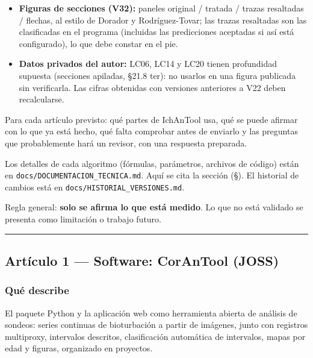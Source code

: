 \documentclass[
  10pt,
]{article}
\begin{document}
\begin{itemize}
  porcentajes, BI ni ii, solo distribución de presencias por intervalo.
  Indicar en los métodos qué tramos se analizaron en este modo.
\item
  \textbf{Figuras de secciones (V32):} paneles original / tratada /
  trazas resaltadas / flechas, al estilo de Dorador y Rodríguez-Tovar;
  las trazas resaltadas son las clasificadas en el programa (incluidas
  las predicciones aceptadas si así está configurado), lo que debe
  constar en el pie.
\item
  \textbf{Datos privados del autor:} LC06, LC14 y LC20 tienen
  profundidad supuesta (secciones apiladas, §21.8 ter): no usarlos en
  una figura publicada sin verificarla. Las cifras obtenidas con
  versiones anteriores a V22 deben recalcularse.
\end{itemize}

Para cada artículo previsto: qué partes de IchAnTool usa, qué se puede
afirmar con lo que ya está hecho, qué falta comprobar antes de enviarlo
y las preguntas que probablemente hará un revisor, con una respuesta
preparada.

Los detalles de cada algoritmo (fórmulas, parámetros, archivos de
código) están en \texttt{docs/DOCUMENTACION\_TECNICA.md}. Aquí se cita
la sección (§). El historial de cambios está en
\texttt{docs/HISTORIAL\_VERSIONES.md}.

Regla general: \textbf{solo se afirma lo que está medido}. Lo que no
está validado se presenta como limitación o trabajo futuro.

\begin{center}\rule{0.5\linewidth}{0.5pt}\end{center}

\hypertarget{artuxedculo-1-software-corantool-joss}{%
\subsection{Artículo 1 --- Software: CorAnTool
(JOSS)}\label{artuxedculo-1-software-corantool-joss}}

\hypertarget{quuxe9-describe}{%
\subsubsection{Qué describe}\label{quuxe9-describe}}

El paquete Python y la aplicación web como herramienta abierta de
análisis de sondeos: series continuas de bioturbación a partir de
imágenes, junto con registros multiproxy, intervalos descritos,
clasificación automática de intervalos, mapas por edad y figuras,
organizado en proyectos.
\end{document}
